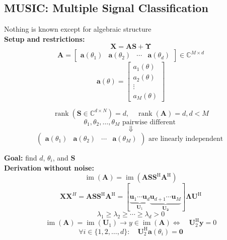 \documentclass[english]{latex4ei/latex4ei_sheet}
\begin{document}
\begin{sectionbox}
  \subsection{MUSIC: Multiple Signal Classification}
  Nothing is known except for algebraic structure\\
  \textbf{Setup and restrictions:}
  $$\boldsymbol{X}=\boldsymbol{A} \boldsymbol{S}+\boldsymbol{\Upsilon}$$
  $$\boldsymbol{A}=\left[\begin{array}{llll}
    \boldsymbol{a}\left(\theta_{1}\right) & \boldsymbol{a}\left(\theta_{2}\right) & \cdots & \boldsymbol{a}\left(\theta_{d}\right)
    \end{array}\right] \in \mathbb{C}^{M \times d}$$
    $$\boldsymbol{a}(\theta)=\left[\begin{array}{c}
      a_{1}(\theta) \\
      a_{2}(\theta) \\
      \vdots \\
      a_{M}(\theta)
      \end{array}\right]$$
  
  $$\operatorname{rank}\left(\boldsymbol{S} \in \mathbb{C}^{d \times N}\right)=d,  \quad \operatorname{rank}(\boldsymbol{A})=d, d<M$$
$$\theta_{1}, \theta_{2}, \ldots, \theta_{M} \text { pairwise different }$$
$$\Downarrow$$
$$\left(\begin{array}{llll}
  \boldsymbol{a}\left(\theta_{1}\right) & \boldsymbol{a}\left(\theta_{2}\right) & \cdots & \boldsymbol{a}\left(\theta_{M}\right)
  \end{array}\right) \text { are linearly independent }$$

\textbf{Goal:} find $d$, $\theta_i$, and $\boldsymbol{S}$\\
\textbf{Derivation without noise:}
$$\operatorname{im}(\boldsymbol{A})=\operatorname{im}\left(\boldsymbol{A} \boldsymbol{S} \boldsymbol{S}^{\mathrm{H}} \boldsymbol{A}^{\mathrm{H}}\right)$$
$$\boldsymbol{X}\boldsymbol{X}^H = \boldsymbol{A \boldsymbol{S} \boldsymbol{S}}^{\mathrm{H}} \boldsymbol{A}^{\mathrm{H}}=[\underbrace{\boldsymbol{u}_{1} \cdots \boldsymbol{u}_{d}}_{\boldsymbol{U}_{1}} \underbrace{\boldsymbol{u}_{d+1} \cdots \boldsymbol{u}_{M}}_{\boldsymbol{U_2}}]
\boldsymbol{\Lambda} \boldsymbol{U}^{\mathrm{H}}$$
$$\lambda_{1} \geq \lambda_{2} \geq \cdots \geq \lambda_{d}>0$$
$$\operatorname{im}(\boldsymbol{A})=\operatorname{im}\left(\boldsymbol{U}_{1}\right) \rightarrow
y \in \operatorname{im}(\boldsymbol{A}) \Longleftrightarrow \quad \boldsymbol{U}_{2}^{\mathrm{H}} \boldsymbol{y}=0$$
$$\forall i \in\{1,2, \ldots, d\}: \quad \boldsymbol{U}_{2}^{\mathrm{H}} \boldsymbol{a}\left(\theta_{i}\right)=\mathbf{0}$$


\end{sectionbox}
\end{document}
